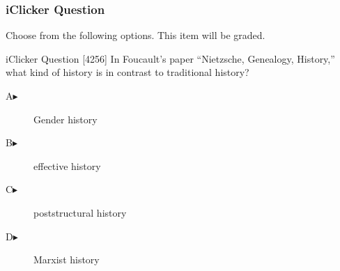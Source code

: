\begin{frame}
  \frametitle{iClicker Question}
Choose from the following options. This item will be graded.
\begin{block}{iClicker Question}
[4256] In Foucault's paper ``Nietzsche, Genealogy, History,'' what kind of history is in contrast to traditional history?
\end{block}
\begin{description}
\item[A\hspace{.2in}$\blacktriangleright$] Gender history
\item[B\hspace{.2in}$\blacktriangleright$] effective history
\item[C\hspace{.2in}$\blacktriangleright$] poststructural history
\item[D\hspace{.2in}$\blacktriangleright$] Marxist history
\end{description}
\end{frame}